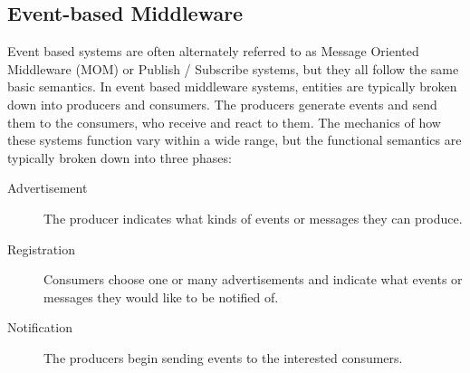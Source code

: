 \documentclass{acm_proc_article-sp}
\begin{document}

\subsection{Event-based Middleware}
\label{sec:techeb}

Event based systems are often alternately referred to as Message Oriented Middleware (MOM) or Publish / Subscribe systems, but they all follow the same basic semantics. In event based middleware systems, entities are typically broken down into producers and consumers. The producers generate events and send them to the consumers, who receive and react to them. The mechanics of how these systems function vary within a wide range, but the functional semantics are typically broken down into three phases:

\begin{description}
\item[Advertisement] The producer indicates what kinds of events or messages they can produce.
\item[Registration] Consumers choose one or many advertisements and indicate what events or messages they would like to be notified of.
\item[Notification] The producers begin sending events to the interested consumers.
\end{description}
\end{document}
